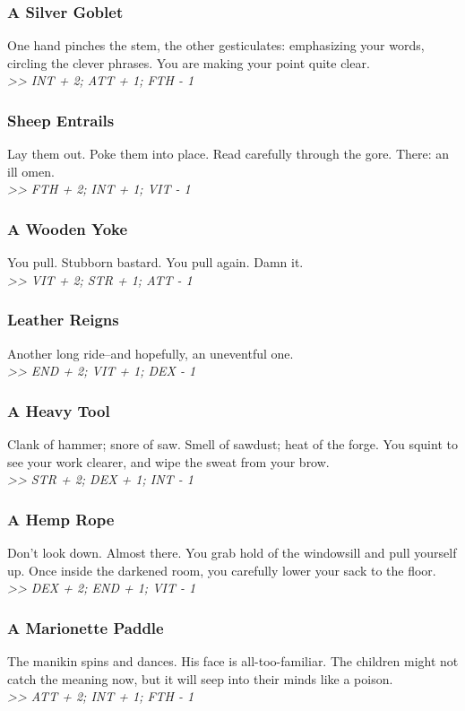 \begin{multicols*}{2}
\subsubsection*{A Silver Goblet}
One hand pinches the stem, the other gesticulates: emphasizing your words, circling the clever phrases. You are making your point quite clear.\\
\emph{>> INT + 2; ATT + 1; FTH - 1}

\subsubsection*{Sheep Entrails}
Lay them out. Poke them into place. Read carefully through the gore. There: an ill omen.\\
\emph{>> FTH + 2; INT + 1; VIT - 1}

\vfill
\columnbreak

\subsubsection*{A Wooden Yoke}
You pull. Stubborn bastard. You pull again. Damn it.\\
\emph{>> VIT + 2; STR + 1; ATT - 1}

\subsubsection*{Leather Reigns}
Another long ride--and hopefully, an uneventful one.\\
\emph{>> END + 2; VIT + 1; DEX - 1}

\subsubsection*{A Heavy Tool}
Clank of hammer; snore of saw. Smell of sawdust; heat of the forge. You squint to see your work clearer, and wipe the sweat from your brow.\\
\emph{>> STR + 2; DEX + 1; INT - 1}

\subsubsection*{A Hemp Rope}
Don’t look down. Almost there. You grab hold of the windowsill and pull yourself up. Once inside the darkened room, you carefully lower your sack to the floor.\\
\emph{>> DEX + 2; END + 1; VIT - 1}

\subsubsection*{A Marionette Paddle}
The manikin spins and dances. His face is all-too-familiar. The children might not catch the meaning now, but it will seep into their minds like a poison.\\
\emph{>> ATT + 2; INT + 1; FTH - 1}


\end{multicols*}

